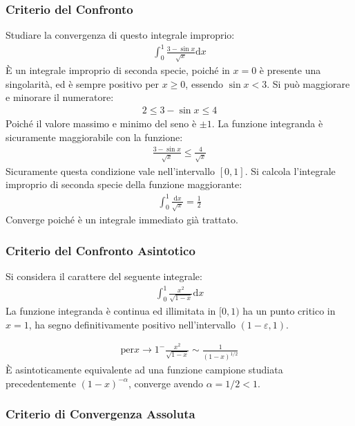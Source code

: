 \documentclass{article}
\numberwithin{equation}{subsection}
\begin{document}
\subsubsection{Criterio del Confronto}

Studiare la convergenza di questo integrale improprio:
\begin{gather*}
    \displaystyle\int_0^1\frac{3-\sin x}{\sqrt{x}}\mathrm{d}x
\end{gather*}
È un integrale improprio di seconda specie, poiché in $x=0$ è presente una singolarità, ed è sempre positivo per $x\geq0$, essendo $\sin x<3$. 
Si può maggiorare e minorare il numeratore:
\begin{gather*}
    2\leq3-\sin x\leq4
\end{gather*}
Poiché il valore massimo e minimo del seno è $\pm1$. La funzione integranda è sicuramente maggiorabile con la funzione:
\begin{gather*}
    \displaystyle\frac{3-\sin x}{\sqrt{x}}\leq\frac{4}{\sqrt{x}}
\end{gather*}
Sicuramente questa condizione vale nell'intervallo $[0,1]$. Si calcola l'integrale improprio di seconda specie della funzione maggiorante:
\begin{gather*}
    \displaystyle\int_0^1\frac{\mathrm{d}x}{\sqrt{x}}=\frac{1}{2}
\end{gather*}
Converge poiché è un integrale immediato già trattato. 

\subsubsection{Criterio del Confronto Asintotico}

Si considera il carattere del seguente integrale:
\begin{gather*}
    \displaystyle\int_0^1\frac{x^2}{\sqrt{1-x}}\mathrm{d}x
\end{gather*}
La funzione integranda è continua ed illimitata in $[0,1)$ ha un punto critico in $x=1$, ha segno definitivamente positivo nell'intervallo $(1-\varepsilon, 1)$. 

\begin{gather*}
    \mbox{per}x\to1^-\displaystyle\frac{x^2}{\sqrt{1-x}}\sim\frac{1}{(1-x)^{1/2}}
\end{gather*}
È asintoticamente equivalente ad una funzione campione studiata precedentemente $(1-x)^{-\alpha}$, converge avendo $\alpha=1/2<1$. 

\subsubsection{Criterio di Convergenza Assoluta}
\end{document}
